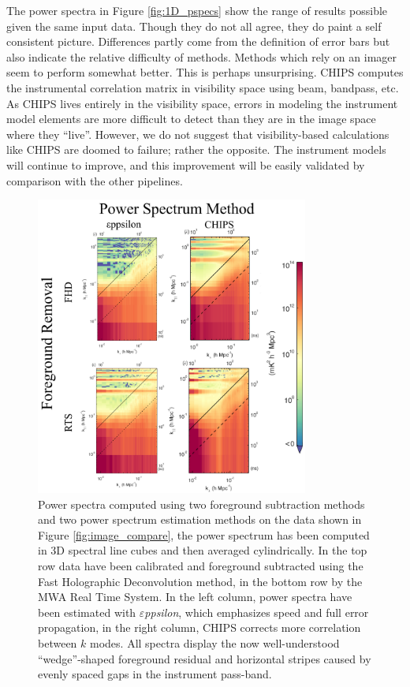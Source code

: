 \documentclass[twolcolumn,iop]{emulateapj}
\def\eppsilon{{\it $\varepsilon$ppsilon}}
\begin{document}
The power spectra in Figure \ref{fig:1D_pspecs} show the range of results possible given the same input data. Though they do not all agree, they do paint a self consistent picture.  Differences partly come from the definition of error bars but also indicate the relative difficulty of methods. Methods which rely on an imager seem to perform somewhat better. This is perhaps unsurprising. CHIPS computes the instrumental correlation matrix in visibility space using beam, bandpass, etc. As CHIPS lives entirely in the visibility space, errors in modeling the instrument model elements are more difficult to detect than they are in the image space where they ``live''.  However, we do not suggest that visibility-based calculations like CHIPS are doomed to failure; rather the opposite. The instrument models will continue to improve, and this improvement will be easily validated by comparison with the other pipelines.






\begin{figure}[htbp]
\begin{center}
\includegraphics[width=0.8\textwidth]{figures/MWA_PS_compare/MWA_PS_compare.png}
\caption{Power spectra computed using two foreground subtraction methods and two power spectrum estimation methods on the data shown in Figure \ref{fig:image_compare}, the power spectrum has been computed in 3D spectral line cubes and then averaged cylindrically.  In the top row data have been calibrated and foreground subtracted using the Fast Holographic Deconvolution method, in the bottom row by the MWA Real Time System.  In the left column, power spectra have been estimated with \eppsilon{}, which emphasizes speed and full error propagation, in the right column, CHIPS corrects more correlation between $k$ modes.  All spectra display the now well-understood ``wedge''-shaped foreground residual and horizontal stripes caused by evenly spaced gaps in the instrument pass-band.   \label{fig:pspec_compare}}
\end{center}
\end{figure}
\end{document}
